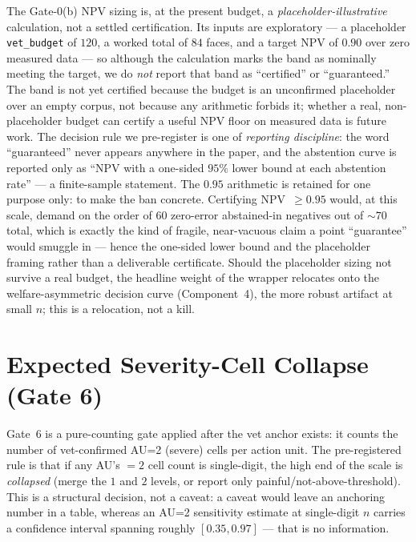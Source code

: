 The Gate-0(b) NPV sizing is, at the present budget, a \emph{placeholder-illustrative}
calculation, not a settled certification. Its inputs are exploratory --- a
placeholder \texttt{vet\_budget} of $120$, a worked total of $84$ faces, and a
target NPV of $0.90$ over zero measured data --- so although the calculation marks
the band as nominally meeting the target, we do \emph{not} report that band as
``certified'' or ``guaranteed.'' The band is not yet certified because the budget is
an unconfirmed placeholder over an empty corpus, not because any arithmetic forbids
it; whether a real, non-placeholder budget can certify a useful NPV floor on
measured data is future work. The decision rule we pre-register is one of
\emph{reporting discipline}: the word ``guaranteed'' never appears anywhere in the
paper, and the abstention curve is reported only as ``NPV with a one-sided $95\%$
lower bound at each abstention rate'' --- a finite-sample statement. The $0.95$
arithmetic is retained for one purpose only: to make the ban concrete. Certifying
NPV~$\geq 0.95$ would, at this scale, demand on the order of $60$ zero-error
abstained-in negatives out of ${\sim}70$ total, which is exactly the kind of
fragile, near-vacuous claim a point ``guarantee'' would smuggle in --- hence the
one-sided lower bound and the placeholder framing rather than a deliverable
certificate. Should the placeholder sizing not survive a real budget, the headline
weight of the wrapper relocates onto the welfare-asymmetric decision curve
(Component~4), the more robust artifact at small $n$; this is a relocation, not a
kill.

\section{Expected Severity-Cell Collapse (Gate 6)}
\label{sec:severity-collapse}

Gate~6 is a pure-counting gate applied after the vet anchor exists: it counts the
number of vet-confirmed AU=2 (severe) cells per action unit. The pre-registered
rule is that if any AU's $=2$ cell count is single-digit, the high end of the
scale is \emph{collapsed} (merge the $1$ and $2$ levels, or report only
painful/not-above-threshold). This is a structural decision, not a caveat: a
caveat would leave an anchoring number in a table, whereas an AU=2 sensitivity
estimate at single-digit $n$ carries a confidence interval spanning roughly
$[0.35, 0.97]$ --- that is no information.

